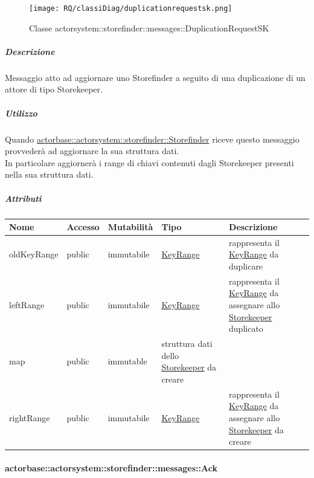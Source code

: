 \documentclass{scalatekids-article}
\begin{document}
\begin{figure}[H]
   \begin{center}
     \texttt{[image: RQ/classiDiag/duplicationrequestsk.png]}
     \caption{Classe actorsystem::storefinder::messages::DuplicationRequestSK}
   \end{center}
 \end{figure}

\subparagraph{Descrizione}
Messaggio atto ad aggiornare uno Storefinder a seguito di una duplicazione
di un attore di tipo Storekeeper.\\

\subparagraph{Utilizzo}
Quando \hyperref[sec:actorbase::actorsystem::storefinder::Storefinder]{actorbase::\allowbreak{}actorsystem::\allowbreak{}storefinder::\allowbreak{}Storefinder}
riceve questo messaggio provvederà ad aggiornare la sua struttura dati.\\In
particolare aggiornerà i range di chiavi contenuti dagli Storekeeper presenti
nella sua struttura dati.

\subparagraph{Attributi} 
\begin{tabular}{| p{3cm} | p{1.5cm} | p{2cm} | p{2cm} | p{8.5cm} |}
  \hline
  Nome & Accesso & Mutabilità & Tipo & Descrizione\\
  \hline
  oldKeyRange & public & immutabile & \hyperref[sec:actorbase::actorsystem::utils::KeyRange]{KeyRange} & rappresenta il \hyperref[sec:actorbase::actorsystem::utils::KeyRange]{KeyRange} da duplicare\\
  \hline
  leftRange & public & immutabile & \hyperref[sec:actorbase::actorsystem::utils::KeyRange]{KeyRange} & rappresenta il \hyperref[sec:actorbase::actorsystem::utils::KeyRange]{KeyRange} da assegnare allo \hyperref[sec:actorbase::actorsystem::storekeeper::Storekeeper]{Storekeeper} duplicato \\
  \hline
  map & public & immutable & struttura dati dello \hyperref[sec:actorbase::actorsystem::storekeeper::Storekeeper]{Storekeeper} da creare\\
  \hline
  rightRange & public & immutabile & \hyperref[sec:actorbase::actorsystem::utils::KeyRange]{KeyRange} & rappresenta il \hyperref[sec:actorbase::actorsystem::utils::KeyRange]{KeyRange} da assegnare allo \hyperref[sec:actorbase::actorsystem::storekeeper::Storekeeper]{Storekeeper} da creare\\
  \hline
\end{tabular}

\paragraph{actorbase::actorsystem::storefinder::messages::Ack}
\label{sec:actorbase::actorsystem::storefinder::messages::Ack}
\end{document}
